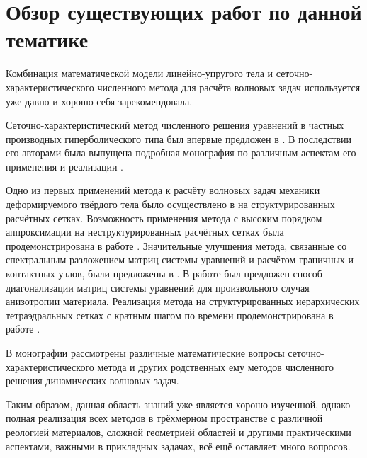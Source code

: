 \section{Обзор существующих работ по данной тематике}

Комбинация математической модели линейно-упругого тела и сеточно-характеристического численного метода для расчёта волновых задач используется уже давно и хорошо себя зарекомендовала.

Сеточно\hyp{}характеристический метод численного решения уравнений в частных производных гиперболического типа был впервые предложен в \cite{magomedov_kholodov_1969}. В последствии его авторами была выпущена подробная монография по различным аспектам его применения и реализации \cite{magomedov_kholodov_1988}.

Одно из первых применений метода к расчёту волновых задач механики деформируемого твёрдого тела было осуществлено в \cite{petrov_kholodov} на структурированных расчётных сетках. Возможность применения метода с высоким порядком аппроксимации на неструктурированных расчётных сетках была продемонстрирована в работе \cite{chelnokov_agapov}. Значительные улучшения метода, связанные со спектральным разложением матриц системы уравнений и расчётом граничных и контактных узлов, были предложены в \cite{chelnokov}. В работе \cite{favorskaya_anysotropy} был предложен способ диагонализации матриц системы уравнений для произвольного случая анизотропии материала. Реализация метода на  структурированных иерархических тетраэдральных сетках с кратным шагом по времени продемонстрирована в работе \cite{favorskaya}.

В монографии \cite{kulikovskiy} рассмотрены различные математические вопросы сеточно\hyp{}характеристического метода и других родственных ему методов численного решения динамических волновых задач.

Таким образом, данная область знаний уже является хорошо изученной, однако полная реализация всех методов в трёхмерном пространстве с различной реологией материалов, сложной геометрией областей и другими практическими аспектами, важными в прикладных задачах, всё ещё оставляет много вопросов.